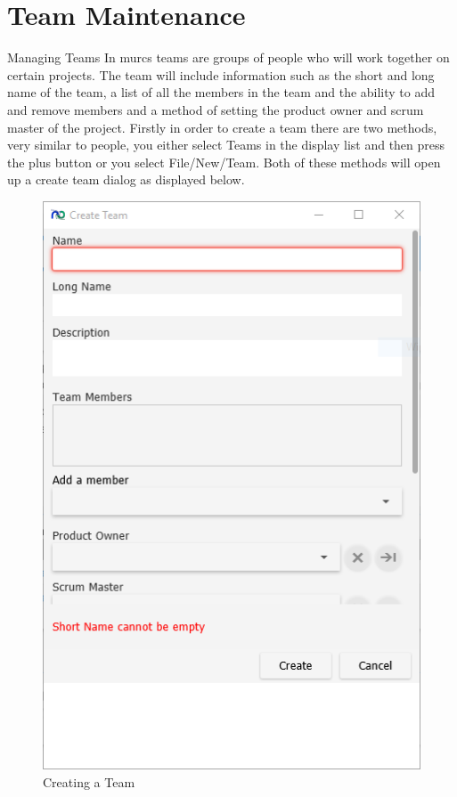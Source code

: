 \section{Team Maintenance}

Managing Teams
\newline\newline
In murcs teams are groups of people who will work together on certain projects. The team will include information such as the short and long name of the team, a list of all the members in the team and the ability to add and remove members and a method of setting the product owner and scrum master of the project.
\newline
Firstly in order to create a team there are two methods, very similar to people, you either select Teams in the display list and then press the plus button or you select File/New/Team. Both of these methods will open up a create team dialog as displayed below.

\begin{figure}[H]
\centering
\includegraphics[width=\textwidth]{images/screenshots/teams1.PNG}
\caption{Creating a Team}
\label{fig:new_project}
\end{figure}

